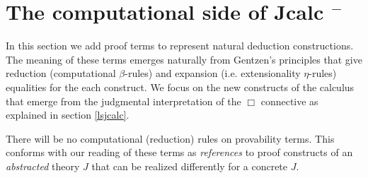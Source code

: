 			
			
			
			
			
			\section{The computational side of Jcalc $^{-}$}
			In this section we add proof terms to represent natural deduction constructions. The  meaning of these terms emerges naturally from Gentzen's principles that give reduction (computational $\beta$-rules) and expansion (i.e. extensionality $\eta$-rules) equalities for the each construct. We focus on the new constructs of the calculus that emerge from the judgmental interpretation of the $\Box$ connective as explained in 
			section \ref{lsjcalc}.
			
			There will be no computational (reduction) rules on  provability terms. 
			This conforms with our reading of these terms  as \textit{references} to proof constructs of an \textit{abstracted} theory $J$ that can be realized 
			differently for a concrete $J$.  
